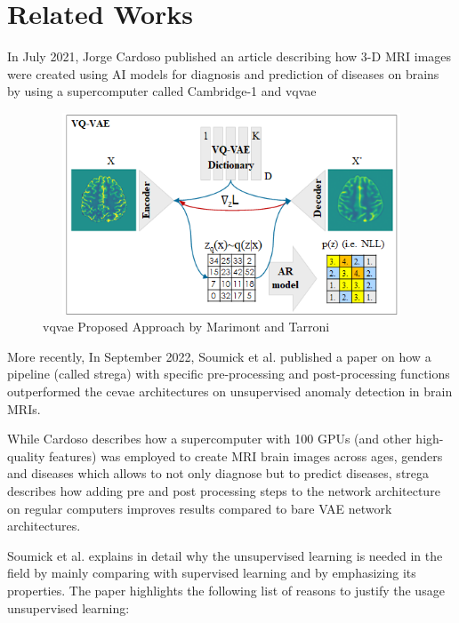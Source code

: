 \section{Related Works}

In July 2021, Jorge Cardoso published an article \cite{jcardoso} describing how 3-D MRI images were created using AI models for diagnosis and prediction of diseases on brains by using a supercomputer called Cambridge-1 and \Acrfull{vqvae}

\begin{figure}[ht]
    \hspace*{-0.8in}
    \centering
    \includegraphics[width = 16cm, height = 6cm]{images/vqvae.png}
    \caption[\Acrshort{vqvae} Proposed Approach by Marimont and Tarroni]{\Acrshort{vqvae} Proposed Approach by Marimont and Tarroni}
    \label{fig:vqvae}
\end{figure}

More recently, In September 2022, Soumick et al. \cite{soumick} published a paper on how a pipeline (called \Acrshort{strega}) with specific pre-processing and post-processing functions outperformed the \Acrfull{cevae} architectures on unsupervised anomaly detection in brain MRIs.

While Cardoso describes how a supercomputer with 100 GPUs (and other high-quality features) was employed to create MRI brain images across ages, genders and diseases which allows to not only diagnose but to predict diseases, \Acrshort{strega} describes how adding pre and post processing steps to the network architecture on regular computers improves results compared to bare VAE network architectures.

Soumick et al. \cite{soumick} explains in detail why the unsupervised learning is needed in the field by mainly comparing with supervised learning and by emphasizing its properties. The paper highlights the following list of reasons to justify the usage unsupervised learning:

